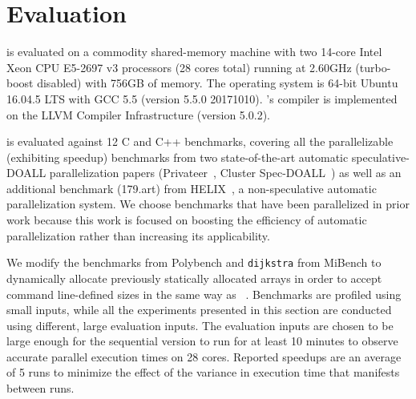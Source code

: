 \section{Evaluation}
\label{eval}
\name is evaluated on a commodity shared-memory machine with two 14-core
Intel Xeon CPU E5-2697 v3 processors (28 cores total) running at 2.60GHz
(turbo-boost disabled) with 756GB of memory. The operating system is
64-bit Ubuntu 16.04.5 LTS with GCC 5.5 (version 5.5.0 20171010).
\namensp's compiler is implemented on the LLVM Compiler Infrastructure
(version 5.0.2)\cite{LLVM:CGO04}.


\name is evaluated against 12 C and C++ benchmarks, covering all the
parallelizable (exhibiting speedup) benchmarks from two
state-of-the-art automatic speculative-DOALL parallelization
papers (Privateer~\cite{johnson:12:pldi}, Cluster
Spec-DOALL~\cite{kim:12:cgo}) as well as an additional benchmark
(179.art) from HELIX~\cite{simone:12:cgo}, a non-speculative automatic
parallelization system.
We choose benchmarks that have been parallelized in prior work because this
work is focused on boosting the efficiency of automatic parallelization
rather than increasing its applicability.

We modify the benchmarks from Polybench and \texttt{dijkstra} from
MiBench to dynamically allocate previously statically allocated arrays in order to accept
command line-defined sizes in the same way as ~\cite{johnson:12:pldi, kim:12:cgo}.
%
%
Benchmarks are profiled using small inputs, while all the
experiments presented in this section are conducted using different,
large evaluation inputs. The evaluation inputs are chosen to be large
enough for the sequential version to run for at least 10 minutes to
observe accurate parallel execution times on 28 cores. Reported speedups
are an average of 5 runs to minimize the effect of the variance in execution
time that manifests between runs.


